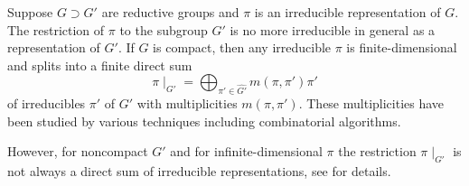 \documentclass[reqno,12pt]{pja00} %
\newcommand{\Hom}{\mbox{\normalfont Hom}}
\theoremstyle{definition}
\theoremstyle{exampstyle} \newtheorem{examp}[theorem]{Theorem}
\begin{document}
Suppose $G \supset G'$ are reductive groups and $\pi$ is an irreducible
representation of $G$. 
The restriction of $\pi$ to the subgroup $G'$ is no more irreducible in general as a representation
of $G'$. If $G$ is compact, then any irreducible $\pi$ is finite-dimensional and splits
into a finite direct sum
\[ \pi\!\mid_{G'} = \bigoplus_{\pi' \in \widehat{G'}} m (\pi, \pi') \pi' \]
of irreducibles $\pi'$ of $G'$ with multiplicities $m(\pi,\pi')$. These multiplicities have been studied
by various techniques including combinatorial algorithms.

However, 
for noncompact $G'$ and for infinite-dimensional $\pi$
the restriction $\pi\!\mid_{G'}$
is not always a direct sum of irreducible representations, see \cite{kobayashi1998discrete3} for details.
\end{document}
